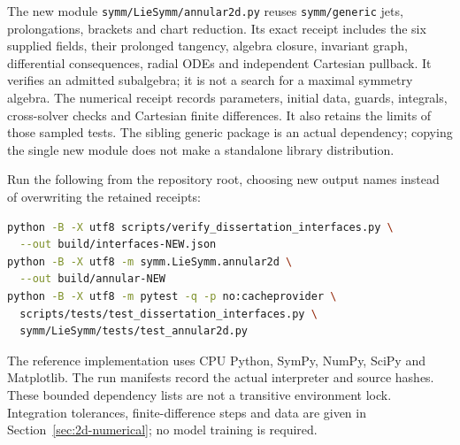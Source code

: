 \documentclass[11pt,a4paper,oneside]{report}
\numberwithin{equation}{chapter}
\DeclareRobustCommand{\code}[1]{\nolinkurl{#1}}
\begin{document}
The new module \code{symm/LieSymm/annular2d.py} reuses
\code{symm/generic} jets, prolongations, brackets and chart reduction.
Its exact receipt includes the six supplied fields, their prolonged
tangency, algebra closure, invariant graph, differential consequences,
radial ODEs and independent Cartesian pullback. It verifies an admitted
subalgebra; it is not a search for a maximal symmetry algebra. The
numerical receipt records parameters, initial data, guards, integrals,
cross-solver checks and Cartesian finite differences. It also retains the
limits of those sampled tests. The sibling generic package is an actual
dependency; copying the single new module does not make a standalone
library distribution.

Run the following from the repository root, choosing new output names
instead of overwriting the retained receipts:
\begin{lstlisting}[language=bash]
python -B -X utf8 scripts/verify_dissertation_interfaces.py \
  --out build/interfaces-NEW.json
python -B -X utf8 -m symm.LieSymm.annular2d \
  --out build/annular-NEW
python -B -X utf8 -m pytest -q -p no:cacheprovider \
  scripts/tests/test_dissertation_interfaces.py \
  symm/LieSymm/tests/test_annular2d.py
\end{lstlisting}
The reference implementation uses CPU Python, SymPy, NumPy, SciPy and
Matplotlib. The run manifests record the actual interpreter and source
hashes. These bounded dependency lists are not a transitive environment
lock. Integration tolerances, finite-difference steps and data are given
in Section~\ref{sec:2d-numerical}; no model training is required.
\end{document}
